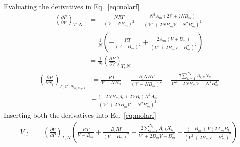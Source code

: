 \documentclass[11pt]{article}
\begin{document}
      Evaluating the derivatives in Eq.~\ref{eq:molarf}
     \begin{align}
     \left(\frac{\partial P}{\partial \mathcal{V}}\right)_{T,N} &= -\frac{N R T}{\left(\mathcal{V}-NB_{m}\right)^{2}} + \frac{N^2 A_m \left(2\mathcal{V}+2N B_m\right)}{\left(\mathcal{V}^{2}+2NB_m\mathcal{V} - N^2B_m^2\right)^2} \\
&=\frac{1}{N} \left(-\frac{R T}{\left(V-B_{m}\right)^{2}} + \frac{2A_m \left(V+B_m\right)}{\left(V^{2}+2B_m V-B_m^2\right)^2}\right) \\
& = \frac{1}{N}\left(\frac{\partial P}{\partial V}\right)_{T,N}
     \end{align}
     \begin{align}
     \left(\frac{\partial P}{\partial N_{l}} \right)_{T,\mathcal{V},N_{k,k\neq l}} &= \frac{R T}{\mathcal{V}- N B_{m}} + \frac{B_l N R T}{\left(\mathcal{V}-N B_m\right)^2} - \frac{2 \sum_{k=1}^{N_{s}} A_{l,k} N_{k}}{\mathcal{V}^2+ 2 N B_{m} \mathcal{V} - N^2 B_m^2}  \nonumber \\
 &+ \frac{\left(-2N B_m B_l + 2\mathcal{V} B_l\right)N^2 A_m}{\left(\mathcal{V}^2+ 2 N B_{m} \mathcal{V} - N^2 B_m^2 \right)^2}
     \end{align}
    Inserting both the derivatives into Eq.~\ref{eq:molarf}
    \begin{align}
    V_{,l} &= \left(\frac{\partial V}{\partial P}\right)_{T,N} \left(\frac{R T}{V- B_{m}} + \frac{B_l R T}{\left(V-B_m\right)^2} - \frac{2 \sum_{k=1}^{N_{s}} A_{l,k} X_{k}}{V^2+ 2 B_{m} V - B_m^2} + \frac{\left(-B_m + V\right) 2 A_m B_l}{\left(V^2+ 2 B_{m} V - B_m^2 \right)^2} \right)
    \end{align}


\end{document}

